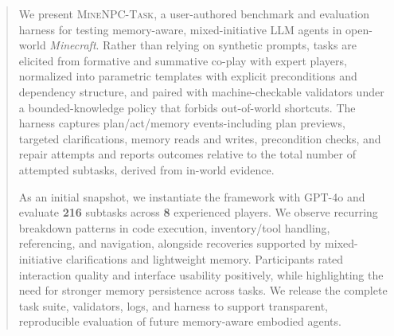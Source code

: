 \documentclass[sigconf]{acmart}
\begin{document}
\begin{abstract}
We present \textsc{MineNPC-Task}, a user-authored benchmark and evaluation harness for testing memory-aware, mixed-initiative LLM agents in open-world \emph{Minecraft}. Rather than relying on synthetic prompts, tasks are elicited from formative and summative co-play with expert players, normalized into parametric templates with explicit preconditions and dependency structure, and paired with machine-checkable validators under a bounded-knowledge policy that forbids out-of-world shortcuts. The harness captures plan/act/memory events-including plan previews, targeted clarifications, memory reads and writes, precondition checks, and repair attempts and reports outcomes relative to the total number of attempted subtasks, derived from in-world evidence.


As an initial snapshot, we instantiate the framework with GPT-4o and evaluate \textbf{216} subtasks across \textbf{8} experienced players. We observe recurring breakdown patterns in code execution, inventory/tool handling, referencing, and navigation, alongside recoveries supported by mixed-initiative clarifications and lightweight memory. Participants rated interaction quality and interface usability positively, while highlighting the need for stronger memory persistence across tasks. We release the complete task suite, validators, logs, and harness to support transparent, reproducible evaluation of future memory-aware embodied agents.
\end{abstract}



\end{document}
